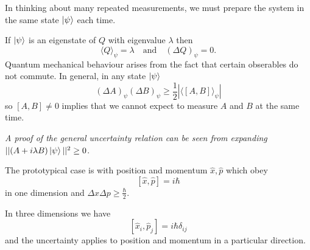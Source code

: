 \documentclass{article}
\begin{document}
\begin{remark}
  In thinking about many repeated measurements, we must prepare the system in the same state $ \ket \psi $ each time.
\end{remark}
\begin{remark}
  If $ \ket \psi $ is an eigenstate of $ Q $ with eigenvalue $ \lambda $ then
  \[
	  \langle Q \rangle_\psi = \lambda \quad \text{and}\quad (\Delta Q)_\psi = 0.
  \]
  Quantum mechanical behaviour arises from the fact that certain obserables do not commute. In general, in any state $ \ket \psi $
  \[
	  (\Delta A)_\psi(\Delta B)_\psi \ge \frac 12 \left|\langle [A,B]\rangle_\psi\right|
  \]
  so $ [A,B]\ne 0 $ implies that we cannot expect to measure $ A $ and $ B $ at the same time.\par

  \textit{A proof of the general uncertainty relation can be seen from expanding} $ ||(A+i\lambda B)\ket \psi||^2 \ge 0 $.
\end{remark}
The prototypical case is with position and momentum $ \hat x, \hat p $ which obey
\[
	[\hat x, \hat p] = i\hbar 
\]
in one dimension and $ \Delta x \Delta p \ge \frac \hbar2 $.\par
In three dimensions we have 
\[
	[\hat x_i, \hat p_j] = i\hbar \delta_{ij}
\]
and the uncertainty applies to position and momentum in a particular direction.
\end{document}
